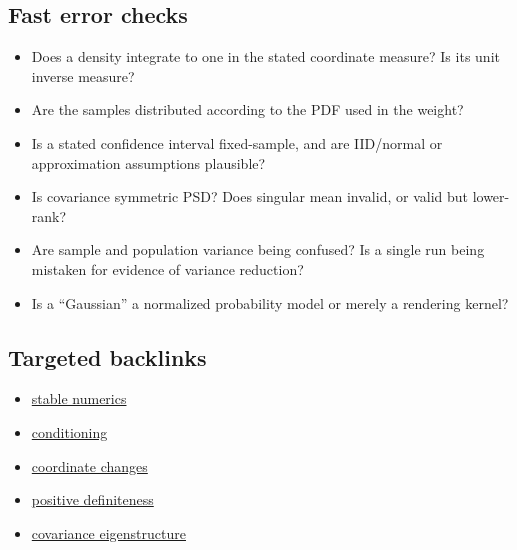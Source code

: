 \subsection{Fast error checks}\label{fast-error-checks}

\begin{itemize}
\tightlist
\item
  Does a density integrate to one in the stated coordinate measure? Is its unit inverse measure?
\item
  Are the samples distributed according to the PDF used in the weight?
\item
  Is a stated confidence interval fixed-sample, and are IID/normal or approximation assumptions plausible?
\item
  Is covariance symmetric PSD? Does singular mean invalid, or valid but lower-rank?
\item
  Are sample and population variance being confused? Is a single run being mistaken for evidence of variance reduction?
\item
  Is a ``Gaussian'' a normalized probability model or merely a rendering kernel?
\end{itemize}

\subsection{Targeted backlinks}\label{targeted-backlinks}

\begin{itemize}
\tightlist
\item
  \href{Continuous\%20Notes/Computing\%20Foundations\%20-\%20From\%20Bits\%20to\%20C++\%20and\%20Systems\%20APIs\#A\%20direction\%20can\%20exist\%20even\%20when\%20the\%20naive\%20length\%20overflows}{stable numerics}
\item
  \href{Continuous\%20Notes/Computing\%20Foundations\%20-\%20From\%20Bits\%20to\%20C++\%20and\%20Systems\%20APIs\#An\%20inverse\%20can\%20exist\%20and\%20still\%20amplify\%20uncertainty}{conditioning}
\item
  \href{Continuous\%20Notes/Computing\%20Foundations\%20-\%20From\%20Bits\%20to\%20C++\%20and\%20Systems\%20APIs\#Coordinates\%20can\%20change\%20while\%20the\%20geometric\%20object\%20stays\%20still}{coordinate changes}
\item
  \href{Continuous\%20Notes/Computing\%20Foundations\%20-\%20From\%20Bits\%20to\%20C++\%20and\%20Systems\%20APIs\#Positive\%20definiteness\%20is\%20a\%20structural\%20promise}{positive definiteness}
\item
  \href{Continuous\%20Notes/Computing\%20Foundations\%20-\%20From\%20Bits\%20to\%20C++\%20and\%20Systems\%20APIs\#Diagonalization\%20leads\%20to\%20the\%20stronger\%20symmetric\%20spectral\%20theorem}{covariance eigenstructure}
\end{itemize}

